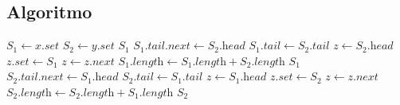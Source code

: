 \subsection{Algoritmo}
\begin{algorithmic}[1]
    \State $S_1 \gets x.\textit{set}$
    \State $S_2 \gets y.\textit{set}$
        \State \Return $S_1$
    \EndIf
        \State $S_1.\textit{tail}.\textit{next} \gets S_2.\textit{head}$
        \State $S_1.\textit{tail} \gets S_2.\textit{tail}$
        \State $z \gets S_2.\textit{head}$
            \State $z.\textit{set} \gets S_1$
            \State $z \gets z.\textit{next}$
        \EndWhile
        \State $S_1.\textit{length} \gets S_1.\textit{length} + S_2.\textit{length}$
        \State \Return $S_1$
    \Else
        \State $S_2.\textit{tail}.\textit{next} \gets S_1.\textit{head}$
        \State $S_2.\textit{tail} \gets S_1.\textit{tail}$
        \State $z \gets S_1.\textit{head}$
            \State $z.\textit{set} \gets S_2$
            \State $z \gets z.\textit{next}$
        \EndWhile
        \State $S_2.\textit{length} \gets S_2.\textit{length} + S_1.\textit{length}$
        \State \Return $S_2$
    \EndIf
\EndProcedure
\end{algorithmic}
